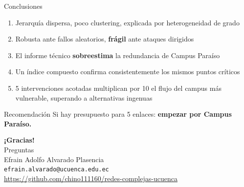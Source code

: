 \documentclass[11pt,aspectratio=169]{beamer}
\begin{document}
\begin{frame}{Conclusiones}
\begin{enumerate}
  \item Jerarquía dispersa, poco clustering, explicada por heterogeneidad de grado
  \item Robusta ante fallos aleatorios, \textbf{frágil} ante ataques dirigidos
  \item El informe técnico \textbf{sobreestima} la redundancia de Campus Paraíso
  \item Un índice compuesto confirma consistentemente los mismos puntos críticos
  \item 5 intervenciones acotadas multiplican por 10 el flujo del campus más
    vulnerable, superando a alternativas ingenuas
\end{enumerate}
\vfill
\begin{block}{Recomendación}
\centering\Large Si hay presupuesto para 5 enlaces: \textbf{empezar por Campus Paraíso.}
\end{block}
\end{frame}

\begin{frame}
\centering
\vspace{1cm}
{\Huge\bfseries\color{azulucuenca} ¡Gracias!}\\[8mm]
{\Large Preguntas}\\[15mm]
{\large Efrain Adolfo Alvarado Plasencia}\\
\texttt{efrain.alvarado@ucuenca.edu.ec}\\[3mm]
\url{https://github.com/chino111160/redes-complejas-ucuenca}
\end{frame}
\end{document}
